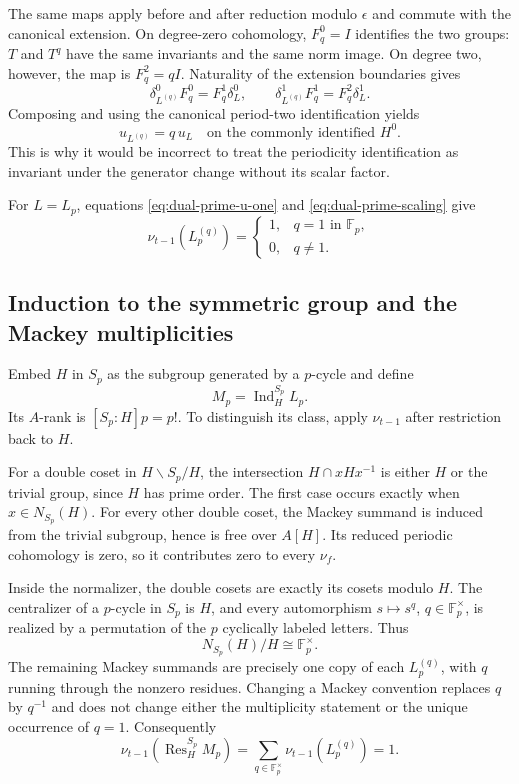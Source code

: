 The same maps apply before and after reduction modulo $\epsilon$ and
commute with the canonical extension.  On degree-zero cohomology,
$F_q^0=I$ identifies the two groups: $T$ and $T^q$ have the same invariants
and the same norm image.  On degree two, however, the map is $F_q^2=qI$.
Naturality of the extension boundaries gives
\[
 \delta_{L^{(q)}}^0F_q^0=F_q^1\delta_L^0,
 \qquad
 \delta_{L^{(q)}}^1F_q^1=F_q^2\delta_L^1.
\]
Composing and using the canonical period-two identification yields
\begin{equation}
\label{eq:dual-prime-scaling}
 u_{L^{(q)}}=q\,u_L
 \quad\text{on the commonly identified }H^0.
\end{equation}
This is why it would be incorrect to treat the periodicity identification
as invariant under the generator change without its scalar factor.

For $L=L_p$, equations \eqref{eq:dual-prime-u-one} and
\eqref{eq:dual-prime-scaling} give
\begin{equation}
\label{eq:dual-prime-twist-detector}
 \nu_{t-1}(L_p^{(q)})=
 \begin{cases}1,&q=1\text{ in }\mathbb F_p,\\0,&q\ne1.
 \end{cases}
\end{equation}

\subsection{Induction to the symmetric group and the Mackey multiplicities}

Embed $H$ in $S_p$ as the subgroup generated by a $p$-cycle and define
\[
 M_p=\operatorname{Ind}_H^{S_p}L_p.
\]
Its $A$-rank is $[S_p:H]p=p!$.  To distinguish its class, apply
$\nu_{t-1}$ after restriction back to $H$.

For a double coset in $H\backslash S_p/H$, the intersection
$H\cap xHx^{-1}$ is either $H$ or the trivial group, since $H$ has prime
order.  The first case occurs exactly when $x\in N_{S_p}(H)$.  For every
other double coset, the Mackey summand is induced from the trivial
subgroup, hence is free over $A[H]$.  Its reduced periodic cohomology is
zero, so it contributes zero to every $\nu_f$.

Inside the normalizer, the double cosets are exactly its cosets modulo
$H$.  The centralizer of a $p$-cycle in $S_p$ is $H$, and every automorphism
$s\mapsto s^q$, $q\in\mathbb F_p^\times$, is realized by a permutation of
the $p$ cyclically labeled letters.  Thus
\[
 N_{S_p}(H)/H\cong\mathbb F_p^\times.
\]
The remaining Mackey summands are precisely one copy of each
$L_p^{(q)}$, with $q$ running through the nonzero residues.  Changing a
Mackey convention replaces $q$ by $q^{-1}$ and does not change either the
multiplicity statement or the unique occurrence of $q=1$.  Consequently
\[
 \nu_{t-1}\!\left(\operatorname{Res}^{S_p}_H M_p\right)
 =\sum_{q\in\mathbb F_p^\times}\nu_{t-1}(L_p^{(q)})=1.
\]

